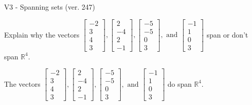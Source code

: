 \begin{exercise}
  \begin{exerciseTitle}V3 - Spanning sets (ver. 247)\end{exerciseTitle}
  \begin{exerciseStatement}
    Explain why the vectors \(\left[\begin{array}{r}
-2 \\
3 \\
4 \\
3
\end{array}\right] , \left[\begin{array}{r}
2 \\
-4 \\
2 \\
-1
\end{array}\right] , \left[\begin{array}{r}
-5 \\
-5 \\
0 \\
3
\end{array}\right] , \text{ and } \left[\begin{array}{r}
-1 \\
1 \\
0 \\
3
\end{array}\right]\) span or don't span \(\mathbb{R}^4\). 
	


  \end{exerciseStatement}
  \begin{exerciseAnswer}
   The vectors \(\left[\begin{array}{r}
-2 \\
3 \\
4 \\
3
\end{array}\right] , \left[\begin{array}{r}
2 \\
-4 \\
2 \\
-1
\end{array}\right] , \left[\begin{array}{r}
-5 \\
-5 \\
0 \\
3
\end{array}\right] , \text{ and } \left[\begin{array}{r}
-1 \\
1 \\
0 \\
3
\end{array}\right]\) 
  	 do  
	span \(\mathbb{R}^4\).
  


  \end{exerciseAnswer}
\end{exercise}